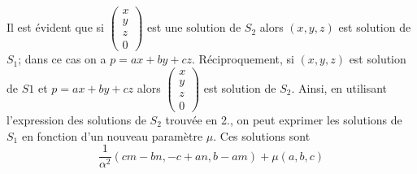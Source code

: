 \begin{enumerate}
  Il est {\'e}vident que si $\left(
        \begin{array}{c}
          x\\
          y\\
          z\\
          0
        \end{array}
       \right)$ est une solution de $S_2$ alors $(x,y,z)$ est
       solution de $S_1$; dans ce cas on a $p=ax+by+cz$.
       R{\'e}ciproquement, si $(x,y,z)$ est solution de $S1$ et
       $p=ax+by+cz$ alors $\left(
        \begin{array}{c}
          x\\
          y\\
          z\\
          0
        \end{array}
       \right)$ est solution de $S_2$.\newline
       Ainsi, en utilisant l'expression des solutions de $S_2$
       trouv{\'e}e en 2., on peut exprimer les solutions de $S_1$ en
       fonction d'un nouveau param{\`e}tre $\mu$. Ces solutions sont
       \[
       \frac{1}{\alpha^2}(cm-bn,-c+an,b-am)+\mu(a,b,c)
       \]
\end{enumerate}
